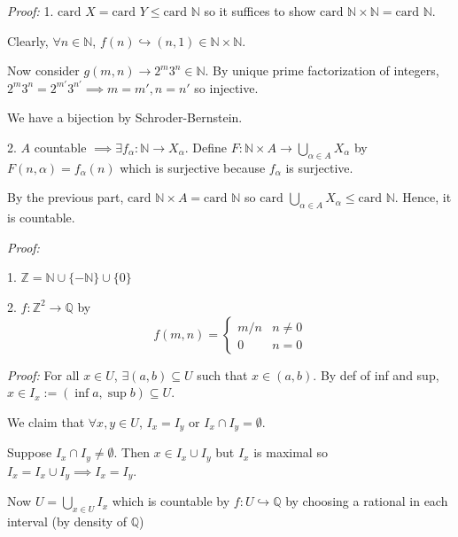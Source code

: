 \documentclass[12pt]{article}
\newcommand{\R}{\mathbb{R}}
\newcommand{\Z}{\mathbb{Z}}
\newcommand{\N}{\mathbb{N}}
\newcommand{\Q}{\mathbb{Q}}
\newcommand{\sub}{\subseteq}
\newcommand{\card}{\text{card }}
\newcommand{\inj}{\hookrightarrow}
\newenvironment*{tbox}[2][gray]{
    \begin{tcolorbox}[
        parbox=false,
        colback=#1!5!white,
        colframe=#1!75!black,
        breakable,
        title={#2}
    ]}
    {\end{tcolorbox}}
\begin{document}
    \begin{tbox}{\textbf{Proposition:} 
        \begin{enumerate}
            \item $X, Y$ countable $\implies$ $X \times Y$ countable
            \item $A$ countable and $X_{\alpha}$ countable for $\alpha \in A$ implies $\bigcup_{\alpha \in A} X_{\alpha}$ countable
        \end{enumerate}}
        \emph{Proof:} 
        1. $\card X = \card Y \leq \card \N$ so it suffices to show $\card \N \times \N = \card \N$. 

        Clearly, $\forall n \in \N$, $f(n) \inj (n, 1) \in \N \times \N$. 

        Now consider $g(m, n) \to 2^m 3^n \in \N$. By unique prime factorization of integers, $2^m 3^n = 2^{m'} 3^{n'} \implies m = m', n = n'$ so injective. 

        We have a bijection by Schroder-Bernstein. 

        2. $A$ countable $\implies \exists f_{\alpha}: \N \to X_{\alpha}$. Define $F: \N \times A \to \bigcup_{\alpha \in A} X_{\alpha}$ by $F(n, \alpha) = f_{\alpha}(n)$ which is surjective because $f_{\alpha}$ is surjective. 

        By the previous part, $\card \N \times A = \card \N$ so $\card \bigcup_{\alpha \in A} X_{\alpha} \leq \card \N$. Hence, it is countable.
    \end{tbox}

    \begin{tbox}{\textbf{Corollary:} $\Z$ and $\Q$ are countable.  }
        \emph{Proof:} 

        1. $\Z = \N \cup \{-\N\} \cup \{0\}$

        2. $f: \Z^2 \to \Q$ by
        \[f(m, n) = \begin{cases}
            m/n & n \neq 0 \\
            0 & n = 0
        \end{cases}\]
    \end{tbox}

    \begin{tbox}{\textbf{Proposition:} Every open set in $\R$ is a countable disjoint union of open intervals }
        \emph{Proof:} For all $x \in U$, $\exists (a, b) \sub U$ such that $x \in (a, b)$. By def of inf and sup, $x \in I_x := (\inf a, \sup b) \sub U$.

        We claim that $\forall x, y \in U$, $I_x = I_y$ or $I_x \cap I_y = \emptyset$. 

        Suppose $I_x \cap I_y \neq \emptyset$. Then $x \in I_x \cup I_y$ but $I_x$ is maximal so $I_x = I_x \cup I_y \implies I_x = I_y$.

        Now $U = \bigcup_{x \in U} I_x$ which is countable by $f: U \inj \Q$ by choosing a rational in each interval (by density of $\Q$)
    \end{tbox}
    
\end{document}
